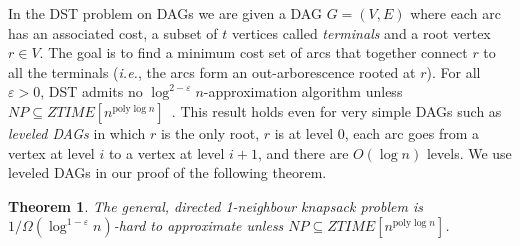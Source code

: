 \documentclass[12pt]{article}
\newtheorem{theorem}{Theorem}
\newcommand{\poly}{\ensuremath{\mathrm{poly}}}
\newcommand{\DST}{{DST}\xspace}
\begin{document}
In the \DST problem on DAGs we are given a DAG $G=(V,E)$ where each arc has an associated cost, a subset of $t$
vertices called {\em terminals} and a root vertex $r \in V$.  The goal
is to find a minimum cost set of arcs that together connect $r$ to all
the terminals ({\em i.e.}, the arcs form an out-arborescence rooted at
$r$).  For all $\varepsilon >0$, \DST admits no
$\log^{2-\varepsilon} n$-approximation algorithm unless $NP\subseteq
ZTIME[n^{\poly\log n}]$~\cite{HK}.  This result holds even for very
simple DAGs such as {\em leveled DAGs} in which $r$ is the only root, $r$ is at level 0,
each arc goes from a vertex at level $i$ to a vertex at level $i+1$,
and there are $O(\log n)$ levels.  We use leveled DAGs in our proof of the following theorem.





\begin{theorem} \label{thm:gd1nlb}
The general, directed 1-neighbour knapsack problem is
$1/\Omega(\log^{1-\varepsilon} n)$-hard to approximate unless $NP\subseteq
ZTIME [n^{\poly\log n}]$.
\end{theorem}
\end{document}
